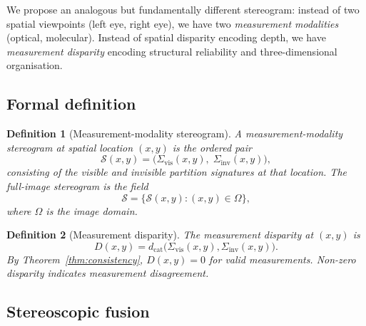 \documentclass[11pt,twocolumn,a4paper]{article}
\newtheorem{definition}{Definition}
\newcommand{\Sigvis}{\Sigma_{\mathrm{vis}}}
\newcommand{\Siginv}{\Sigma_{\mathrm{inv}}}
\newcommand{\dcat}{d_{\mathrm{cat}}}
\begin{document}
We propose an analogous but fundamentally different stereogram: instead of two spatial viewpoints (left eye, right eye), we have two \emph{measurement modalities} (optical, molecular).
Instead of spatial disparity encoding depth, we have \emph{measurement disparity} encoding structural reliability and three-dimensional organisation.

\subsection{Formal definition}

\begin{definition}[Measurement-modality stereogram]\label{def:stereogram}
A measurement-modality stereogram at spatial location $(x,y)$ is the ordered pair
\begin{equation}\label{eq:stereogram}
\mathcal{S}(x,y) = \bigl(\Sigvis(x,y),\; \Siginv(x,y)\bigr),
\end{equation}
consisting of the visible and invisible partition signatures at that location.
The full-image stereogram is the field
\begin{equation}\label{eq:full_stereogram}
\mathcal{S} = \bigl\{\mathcal{S}(x,y) : (x,y) \in \Omega\bigr\},
\end{equation}
where $\Omega$ is the image domain.
\end{definition}

\begin{definition}[Measurement disparity]\label{def:disparity}
The measurement disparity at $(x,y)$ is
\begin{equation}\label{eq:disparity}
D(x,y) = \dcat\bigl(\Sigvis(x,y), \Siginv(x,y)\bigr).
\end{equation}
By Theorem~\ref{thm:consistency}, $D(x,y) = 0$ for valid measurements.
Non-zero disparity indicates measurement disagreement.
\end{definition}

\subsection{Stereoscopic fusion}
\end{document}
